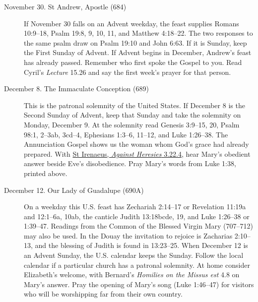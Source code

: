\begin{description}
\item[November 30. St Andrew, Apostle (684)] If November 30 falls on an
Advent weekday, the feast supplies Romans 10:9--18, Psalm 19:8, 9, 10,
11, and Matthew 4:18--22. The two responses to the same psalm draw on
Psalm 19:10 and John 6:63. If it is Sunday, keep the First Sunday of
Advent. If Advent begins in December, Andrew's feast has already passed.
Remember who first spoke the Gospel to you. Read Cyril's \emph{Lecture}
15.26 and say the first week's prayer for that person.
\item[December 8. The Immaculate Conception (689)] This is the patronal
solemnity of the United States. If December 8 is the Second Sunday of
Advent, keep that Sunday and take the solemnity on Monday, December 9.
At the solemnity read Genesis 3:9--15, 20, Psalm 98:1, 2--3ab, 3cd--4,
Ephesians 1:3--6, 11--12, and Luke 1:26--38. The Annunciation Gospel
shows us the woman whom God's grace had already prepared. With
\href{https://www.newadvent.org/fathers/0103322.htm}{St Irenaeus, \emph{Against Heresies} 3.22.4},
hear Mary's obedient answer beside Eve's disobedience. Pray Mary's words
from Luke 1:38, printed above.
\item[December 12. Our Lady of Guadalupe (690A)] On a weekday this U.S.
feast has Zechariah 2:14--17 or Revelation 11:19a and 12:1--6a, 10ab,
the canticle Judith 13:18bcde, 19, and Luke 1:26--38 or 1:39--47.
Readings from the Common of the Blessed Virgin Mary (707--712) may also
be used. In the Douay the invitation to rejoice is Zacharias 2:10--13,
and the blessing of Judith is found in 13:23--25.
When December 12 is an Advent Sunday, the U.S. calendar keeps
the Sunday. Follow the local calendar if a particular church has a
patronal solemnity. At home consider Elizabeth's welcome, with Bernard's
\emph{Homilies on the Missus est} 4.8 on Mary's answer. Pray the opening
of Mary's song (Luke 1:46--47) for visitors who will be worshipping far
from their own country.
\end{description}
